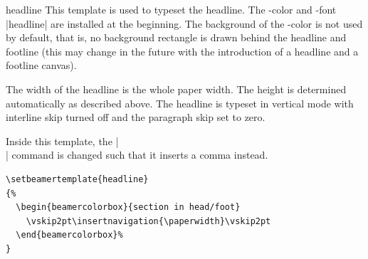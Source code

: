\begin{element}{headline}\yes\yes\yes
  This template is used to typeset the headline. The \beamer-color and -font |headline| are installed at the beginning. The background of the \beamer-color is not used by default, that is, no background rectangle is drawn behind the headline and footline (this may change in the future with the introduction of a headline and a footline canvas).

  The width of the headline is the whole paper width. The height is determined automatically as described above. The headline is typeset in vertical mode with interline skip turned off and the paragraph skip set to zero.

  Inside this template, the |\\| command is changed such that it inserts a comma instead.

  \example
\begin{verbatim}
\setbeamertemplate{headline}
{%
  \begin{beamercolorbox}{section in head/foot}
    \vskip2pt\insertnavigation{\paperwidth}\vskip2pt
  \end{beamercolorbox}%
}
\end{verbatim}


\end{element}
